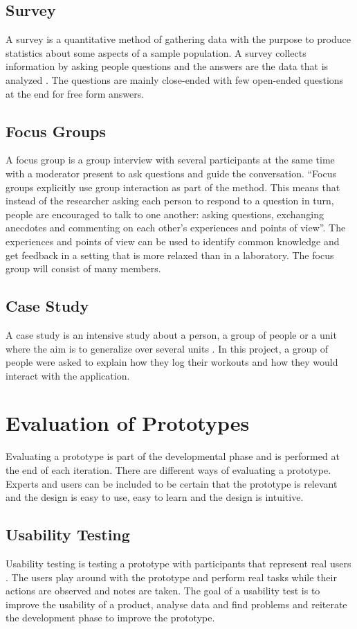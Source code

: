 \subsection{Survey}
A survey is a quantitative method of gathering data with the purpose to produce statistics about some aspects of a sample population. A survey collects information by asking people questions and the answers are the data that is analyzed \cite{fowler2013survey}. The questions are mainly close-ended with few open-ended questions at the end for free form answers.
\subsection{Focus Groups}
A focus group is a group interview with several participants at the same time with a moderator present to ask questions and guide the conversation. “Focus groups explicitly use group interaction as part of the method. This means that instead of the researcher asking each person to respond to a question in turn, people are encouraged to talk to one another: asking questions, exchanging anecdotes and commenting on each other's experiences and points of view”\cite{Kitzinger}. The experiences and points of view can be used to identify common knowledge and get feedback in a setting that is more relaxed than in a laboratory. The focus group will consist of many members. 

\subsection{Case Study}
A case study is an intensive study about a person, a group of people or a unit where the aim is to generalize over several units \cite{Heale7}. In this project, a group of people were asked to explain how they log their workouts and how they would interact with the application.
\section{Evaluation of Prototypes}
Evaluating a prototype is part of the developmental phase and is performed at the end of each iteration. There are different ways of evaluating a prototype. Experts and users can be included to be certain that the prototype is relevant and the design is easy to use, easy to learn and the design is intuitive. 

\subsection{Usability Testing}
Usability testing is testing a prototype with participants that represent real users \cite{dumas1999practical} . The users play around with the prototype and perform real tasks while their actions are observed and notes are taken. The goal of a usability test is to improve the usability of a product, analyse data and find problems and reiterate the development phase to improve the prototype.
